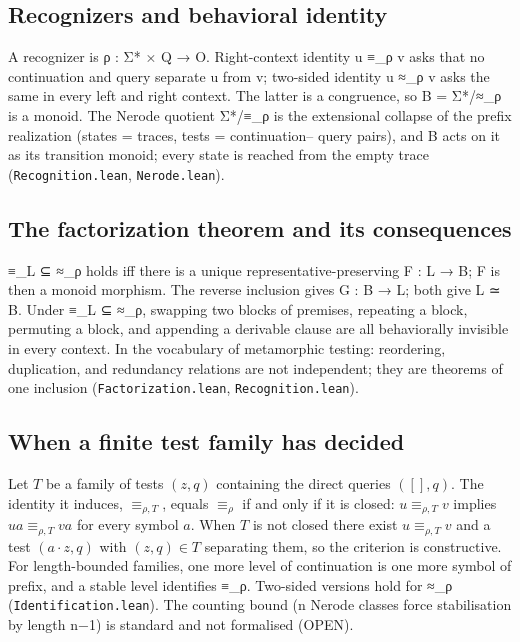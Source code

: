 \hypertarget{recognizers-and-behavioral-identity}{%
\subsection{Recognizers and behavioral
identity}\label{recognizers-and-behavioral-identity}}

A recognizer is ρ : Σ* × Q → O. Right-context identity u ≡\_ρ v asks
that no continuation and query separate u from v; two-sided identity u
≈\_ρ v asks the same in every left and right context. The latter is a
congruence, so B = Σ*/≈\_ρ is a monoid. The Nerode quotient Σ*/≡\_ρ is
the extensional collapse of the prefix realization (states = traces,
tests = continuation-- query pairs), and B acts on it as its transition
monoid; every state is reached from the empty trace
(\texttt{Recognition.lean}, \texttt{Nerode.lean}).

\hypertarget{the-factorization-theorem-and-its-consequences}{%
\subsection{The factorization theorem and its
consequences}\label{the-factorization-theorem-and-its-consequences}}

≡\_L ⊆ ≈\_ρ holds iff there is a unique representative-preserving F : L
→ B; F is then a monoid morphism. The reverse inclusion gives G : B → L;
both give L ≃ B. Under ≡\_L ⊆ ≈\_ρ, swapping two blocks of premises,
repeating a block, permuting a block, and appending a derivable clause
are all behaviorally invisible in every context. In the vocabulary of
metamorphic testing: reordering, duplication, and redundancy relations
are not independent; they are theorems of one inclusion
(\texttt{Factorization.lean}, \texttt{Recognition.lean}).

\hypertarget{when-a-finite-test-family-has-decided}{%
\subsection{When a finite test family has
decided}\label{when-a-finite-test-family-has-decided}}

Let $T$ be a family of tests $(z,q)$ containing the direct queries
$([],q)$. The identity it induces, $\equiv_{\rho,T}$, equals
$\equiv_\rho$ if and only if it is closed: $u\equiv_{\rho,T}v$ implies
$ua\equiv_{\rho,T}va$ for every symbol $a$. When $T$ is not closed there
exist $u\equiv_{\rho,T}v$ and a test $(a\cdot z,q)$ with $(z,q)\in T$
separating them, so the criterion is constructive. For
length-bounded families, one more level of continuation is one more
symbol of prefix, and a stable level identifies ≡\_ρ. Two-sided versions
hold for ≈\_ρ (\texttt{Identification.lean}). The counting bound (n
Nerode classes force stabilisation by length n−1) is standard and not
formalised (OPEN).

